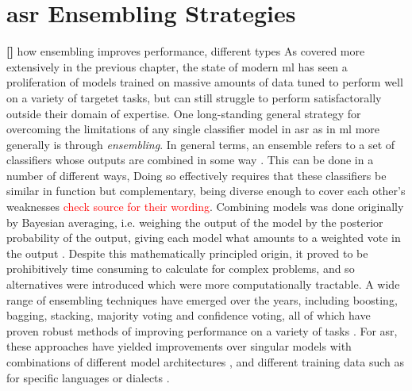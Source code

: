 \documentclass[thesis]{cluu}
\newcounter{paranum}
\newcommand{\numberedparagraph}{\par\refstepcounter{paranum}\textbf{[\theparanum] }}
\newcommand{\todo}[1]{\textcolor{red}{#1}}
\begin{document}
\section{\gls{asr} Ensembling Strategies}


\parencite[inter alia]{barteldsMakingMoreLittle2023,zhangL2GENNeuralPhoneme2022,kheirAutomaticPronunciationAssessment2023,thaiSyntheticDataAugmentation2019}
\numberedparagraph{how ensembling improves performance, different types}
As covered more extensively in the previous chapter, the state of modern \gls{ml} has seen a proliferation of models trained on massive amounts of data tuned to perform well on a variety of targetet tasks, but can still struggle to perform satisfactorally outside their domain of expertise. One long-standing general strategy for overcoming the limitations of any single classifier model in \gls{asr} as in \gls{ml} more generally is through \textit{ensembling}. In general terms, an ensemble refers to a set of classifiers whose outputs are combined in some way \parencite{dietterichEnsembleMethodsMachine2000}. This can be done in a number of different ways,  Doing so effectively requires that 
these classifiers be similar in function but complementary, being diverse enough to cover each other's weaknesses \parencite{hansenNeuralNetworkEnsembles1990}\todo{check source for their wording}. Combining models was done originally by Bayesian averaging, i.e. weighing the output of the model by the posterior probability of the output, giving each model what amounts to a weighted vote in the output \parencite{dietterichEnsembleMethodsMachine2000}. Despite this mathematically principled origin, it proved to be prohibitively time consuming to calculate for complex problems, and so alternatives were introduced which were more computationally tractable. A wide range of ensembling techniques have emerged over the years, including boosting, bagging, stacking, majority voting and confidence voting, all of which have proven robust methods of improving performance on a variety of tasks \parencite[see][inter alia]{maclinEmpiricalEvaluationBagging1997,dengScalableStackingLearning2012,fiscus1997post,gitmanConfidencebasedEnsemblesEndtoEnd2023}. For \gls{asr}, these approaches have yielded improvements over singular models with combinations of different model architectures \parencite{arunkumarInvestigationEnsembleFeatures2022,dengEnsembleDeepLearning2014}, and different training data such as for specific languages or dialects \parencite[inter alia]{agrawalLearningWhenTrust2023,gitmanConfidencebasedEnsemblesEndtoEnd2023}.
\end{document}
